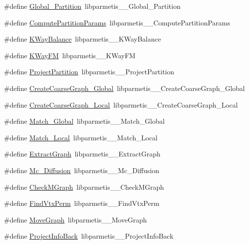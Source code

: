 \begin{DoxyCompactItemize}
\item 
\#define \hyperlink{a00960_a7c67abe2606a116d7687d332aaa0aa65}{Global\+\_\+\+Partition}~libparmetis\+\_\+\+\_\+\+Global\+\_\+\+Partition
\item 
\#define \hyperlink{a00960_a2bca781d16b846e26456d0a3c4990ec6}{Compute\+Partition\+Params}~libparmetis\+\_\+\+\_\+\+Compute\+Partition\+Params
\item 
\#define \hyperlink{a00960_a81791ee70148c0691063093c38769e3f}{K\+Way\+Balance}~libparmetis\+\_\+\+\_\+\+K\+Way\+Balance
\item 
\#define \hyperlink{a00960_a0b0db037bca88b209186d729ee7d7cbf}{K\+Way\+FM}~libparmetis\+\_\+\+\_\+\+K\+Way\+FM
\item 
\#define \hyperlink{a00960_a129b991dd3954464e24dd864b3f67531}{Project\+Partition}~libparmetis\+\_\+\+\_\+\+Project\+Partition
\item 
\#define \hyperlink{a00960_ae42ed84ba869f993bb807dadb27171ac}{Create\+Coarse\+Graph\+\_\+\+Global}~libparmetis\+\_\+\+\_\+\+Create\+Coarse\+Graph\+\_\+\+Global
\item 
\#define \hyperlink{a00960_ac8cc178fc3d7b76a51ba54c58fe6e9b2}{Create\+Coarse\+Graph\+\_\+\+Local}~libparmetis\+\_\+\+\_\+\+Create\+Coarse\+Graph\+\_\+\+Local
\item 
\#define \hyperlink{a00960_aca5008ca6c5dc0f50046e7203ea51d9c}{Match\+\_\+\+Global}~libparmetis\+\_\+\+\_\+\+Match\+\_\+\+Global
\item 
\#define \hyperlink{a00960_a84d04716c7cc885e0df476d8eeaaff37}{Match\+\_\+\+Local}~libparmetis\+\_\+\+\_\+\+Match\+\_\+\+Local
\item 
\#define \hyperlink{a00960_aaa1da1fdd003b425464aa69b5cfdc71d}{Extract\+Graph}~libparmetis\+\_\+\+\_\+\+Extract\+Graph
\item 
\#define \hyperlink{a00960_a06413ad3d4bd91570f9575fc768b35cd}{Mc\+\_\+\+Diffusion}~libparmetis\+\_\+\+\_\+\+Mc\+\_\+\+Diffusion
\item 
\#define \hyperlink{a00960_ac06564c103223007781f889396931355}{Check\+M\+Graph}~libparmetis\+\_\+\+\_\+\+Check\+M\+Graph
\item 
\#define \hyperlink{a00960_a39fa796f82cbe301fa93ff9dc6ce8078}{Find\+Vtx\+Perm}~libparmetis\+\_\+\+\_\+\+Find\+Vtx\+Perm
\item 
\#define \hyperlink{a00960_ab9071a1af36ec0fd8f692a7c2d762ff4}{Move\+Graph}~libparmetis\+\_\+\+\_\+\+Move\+Graph
\item 
\#define \hyperlink{a00960_a5d1cc0a5fff236edbc2b8abc0b59bb57}{Project\+Info\+Back}~libparmetis\+\_\+\+\_\+\+Project\+Info\+Back

\end{DoxyCompactItemize}
